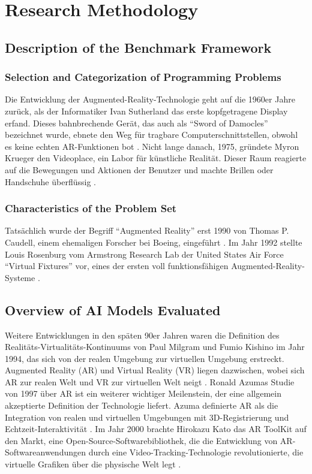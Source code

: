 
\section{Research Methodology}

\subsection{Description of the Benchmark Framework}

\subsubsection{Selection and Categorization of Programming Problems}

Die Entwicklung der Augmented-Reality-Technologie geht auf die 1960er Jahre zurück, als der Informatiker Ivan Sutherland das erste kopfgetragene Display erfand. Dieses bahnbrechende Gerät, das auch als “Sword of Damocles” bezeichnet wurde, ebnete den Weg für tragbare Computerschnittstellen, obwohl es keine echten AR-Funktionen bot \cite{Sutherland1968AHT}. Nicht lange danach, 1975, gründete Myron Krueger den Videoplace, ein Labor für künstliche Realität. Dieser Raum reagierte auf die Bewegungen und Aktionen der Benutzer und machte Brillen oder Handschuhe überflüssig \cite{Videoplace}.

\subsubsection{Characteristics of the Problem Set}

Tatsächlich wurde der Begriff “Augmented Reality” erst 1990 von Thomas P. Caudell, einem ehemaligen Forscher bei Boeing, eingeführt \cite{Lee2012AugmentedRI}. Im Jahr 1992 stellte Louis Rosenburg vom Armstrong Research Lab der United States Air Force “Virtual Fixtures” vor, eines der ersten voll funktionsfähigen Augmented-Reality-Systeme \cite{rosenberg1992use}.

\subsection{Overview of AI Models Evaluated}

Weitere Entwicklungen in den späten 90er Jahren waren die Definition des Realitäts-Virtualitäts-Kontinuums von Paul Milgram und Fumio Kishino im Jahr 1994, das sich von der realen Umgebung zur virtuellen Umgebung erstreckt. Augmented Reality (AR) und Virtual Reality (VR) liegen dazwischen, wobei sich AR zur realen Welt und VR zur virtuellen Welt neigt  \cite{Milgram94a}. Ronald Azumas Studie von 1997 über AR ist ein weiterer wichtiger Meilenstein, der eine allgemein akzeptierte Definition der Technologie liefert. Azuma definierte AR als die Integration von realen und virtuellen Umgebungen mit 3D-Registrierung und Echtzeit-Interaktivität \cite{Azuma1997ASO}. Im Jahr 2000 brachte Hirokazu Kato das AR ToolKit auf den Markt, eine Open-Source-Softwarebibliothek, die die Entwicklung von AR-Softwareanwendungen durch eine Video-Tracking-Technologie revolutionierte, die virtuelle Grafiken über die physische Welt legt \cite{ARTooLKIT}.

